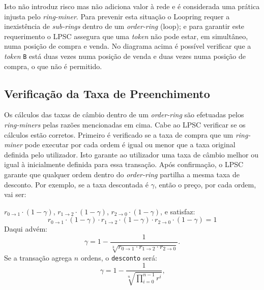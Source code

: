 \documentclass[UTF8,nofonts]{article}
\begin{document}
\begin{multicols}{2}
\begin{enumerate}
Isto não introduz risco mas não adiciona valor à rede e é considerada uma prática injusta pelo \textit{ring-miner}. Para prevenir esta situação o Loopring requer a inexistência de \textit{sub-rings} dentro de um \textit{order-ring} (loop); e para garantir este requerimento o LPSC assegura que uma \textit{token} não pode estar, em simultâneo, numa posição de compra e venda. No diagrama acima é possível verificar que a \textit{token} \verb|B| está duas vezes numa posição de venda e duas vezes numa posição de compra, o que não é permitido.

\subsection{Verificação da Taxa de Preenchimento}


Os cálculos das taxas de câmbio dentro de um \textit{order-ring} são efetuadas pelos \textit{ring-miners} pelas razões mencionadas em cima. Cabe ao LPSC verificar se os cálculos estão corretos. Primeiro é verificado se a taxa de compra que um \textit{ring-miner} pode executar por cada ordem é igual ou menor que a taxa original definida pelo utilizador. Isto garante ao utilizador uma taxa de câmbio melhor ou igual à inicialmente definida para essa transação. Após confirmação, o LPSC garante que qualquer ordem dentro do \textit{order-ring} partilha a mesma taxa de desconto. Por exemplo, se a taxa descontada é $\gamma$, então o preço, por cada ordem, vai ser:

$r_{0\rightarrow 1} \cdot (1-\gamma)$, $r_{1\rightarrow 2} \cdot (1-\gamma)$, $r_{2 \rightarrow 0} \cdot (1-\gamma)$, e satisfaz: 
\begin{equation}
r_{0\rightarrow 1} \cdot (1-\gamma)\cdot r_{1\rightarrow 2} \cdot (1-\gamma) \cdot r_{2 \rightarrow 0} \cdot (1-\gamma) = 1
\end{equation}
Daqui advém: 
\begin{equation}
\gamma = 1- \frac{1}{\sqrt[3]{r_{0\rightarrow 1} \cdot r_{1\rightarrow 2} \cdot r_{2\rightarrow 0}}}\text{.}
\end{equation}
Se a transação agrega $n$ ordens, o \texttt{desconto} será: 
\begin{equation}
\gamma = 1- \frac{1}{\sqrt[n]{\prod_{i=0}^{n-1} r^i}} \text{,}
\end{equation}


\end{enumerate}
\end{multicols}
\end{document}
